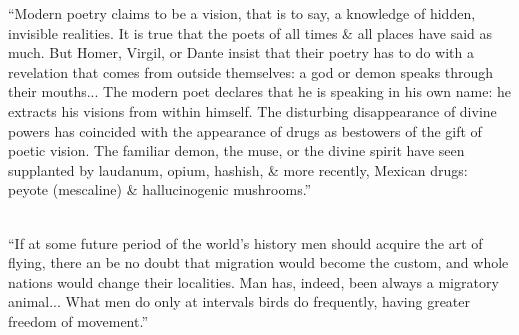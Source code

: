 \documentclass[oneside, 11pt, twocolumn]{book}
\begin{document}
\Fontlukas

``Modern poetry claims to be a vision, that is to say, a knowledge of hidden, invisible realities. It is true that the poets of all times \& all places have said as much. But Homer, Virgil, or Dante insist that their poetry has to do with a revelation that comes from outside themselves: a god or demon speaks through their mouths... The modern poet declares that he is speaking in his own name: he extracts his visions from within himself. The disturbing disappearance of divine powers has coincided with the appearance of drugs as bestowers of the gift of poetic vision. The familiar demon, the muse, or the divine spirit have seen supplanted by laudanum, opium, hashish, \& more recently, Mexican drugs: peyote (mescaline) \& hallucinogenic mushrooms.'' \\
\\
\vspace{2em}

``If at some future period of the world's history men should acquire the art of flying, there an be no doubt that migration would become the custom, and whole nations would change their localities.  Man has, indeed, been always a migratory animal... What men do only at intervals birds do frequently, having greater freedom of movement.''
\\

\vfill
\end{document}
